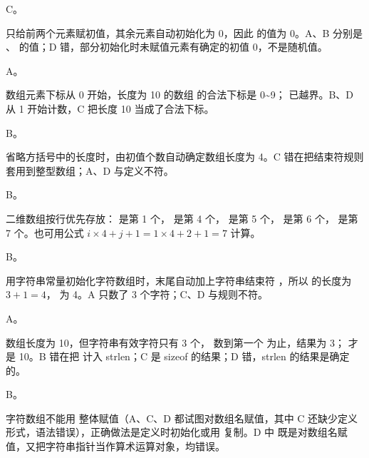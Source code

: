\documentclass[a4paper,11pt]{article}
\begin{document}


\q C。\begin{analysis} 只给前两个元素赋初值，其余元素自动初始化为 0，因此  的值为 0。A、B 分别是 、 的值；D 错，部分初始化时未赋值元素有确定的初值 0，不是随机值。\end{analysis}

\q A。\begin{analysis}数组元素下标从 0 开始，长度为 10 的数组  的合法下标是 0\textasciitilde 9； 已越界。B、D 从 1 开始计数，C 把长度 10 当成了合法下标。\end{analysis}

\q B。\begin{analysis} 省略方括号中的长度时，由初值个数自动确定数组长度为 4。C 错在把结束符规则套用到整型数组；A、D 与定义不符。\end{analysis}

\q B。\begin{analysis}二维数组按行优先存放： 是第 1 个， 是第 4 个， 是第 5 个， 是第 6 个， 是第 7 个。也可用公式 $i\times4+j+1=1\times4+2+1=7$ 计算。\end{analysis}

\q B。\begin{analysis}用字符串常量初始化字符数组时，末尾自动加上字符串结束符 ，所以  的长度为 $3+1=4$， 为 4。A 只数了 3 个字符；C、D 与规则不符。\end{analysis}

\q A。\begin{analysis} 数组长度为 10，但字符串有效字符只有 3 个， 数到第一个  为止，结果为 3； 才是 10。B 错在把  计入 strlen；C 是 sizeof 的结果；D 错，strlen 的结果是确定的。\end{analysis}

\q B。\begin{analysis}字符数组不能用 \code{=} 整体赋值（A、C、D 都试图对数组名赋值，其中 C 还缺少定义形式，语法错误），正确做法是定义时初始化或用  复制。D 中  既是对数组名赋值，又把字符串指针当作算术运算对象，均错误。\end{analysis}
\end{document}
